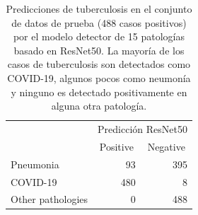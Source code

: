 \begin{table}[!ht]
    \centering
    \begin{tabular}{lcr}
                                   & \multicolumn{2}{c}{Predicción ResNet50}                                \\ \cline{2-3}
    \multicolumn{1}{l|}{}          & \multicolumn{1}{c|}{Positive} & \multicolumn{1}{c|}{Negative} \\ \hline
    \multicolumn{1}{|l|}{Pneumonia}& \multicolumn{1}{r|}{93}      & \multicolumn{1}{r|}{395}      \\ \hline
    \multicolumn{1}{|l|}{COVID-19}  & \multicolumn{1}{r|}{480}        & \multicolumn{1}{r|}{8}     \\ \hline
    \multicolumn{1}{|l|}{Other pathologies}  & \multicolumn{1}{r|}{0}        & \multicolumn{1}{r|}{488}     \\ \hline
    \end{tabular}
    \caption{Predicciones de tuberculosis en el conjunto de datos de prueba (488 casos positivos) por el modelo
             detector de 15 patologías basado en ResNet50. La mayoría de los casos de tuberculosis son
             detectados como COVID-19, algunos pocos como neumonía y ninguno es detectado positivamente
             en alguna otra patología.}
    \label{table_tb1_15}
\end{table}

